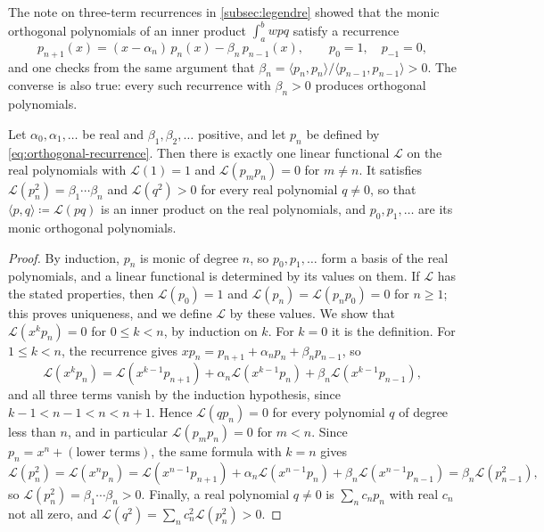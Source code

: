 The note on three-term recurrences in \cref{subsec:legendre} showed that the monic orthogonal polynomials of an inner product $\int_a^bwpq$ satisfy a recurrence
\begin{equation}
p_{n+1}(x)=(x-\alpha_n)\,p_n(x)-\beta_n\,p_{n-1}(x),\qquad p_0=1,\quad p_{-1}=0,
\label{eq:orthogonal-recurrence}
\end{equation}
and one checks from the same argument that $\beta_n=\langle p_n,p_n\rangle/\langle p_{n-1},p_{n-1}\rangle>0$. The converse is also true: every such recurrence with $\beta_n>0$ produces orthogonal polynomials.

\begin{theorem}[Favard]
\label{thm:favard}
Let $\alpha_0,\alpha_1,\ldots$ be real and $\beta_1,\beta_2,\ldots$ positive, and let $p_n$ be defined by \eqref{eq:orthogonal-recurrence}. Then there is exactly one linear functional $\mathcal L$ on the real polynomials with $\mathcal L(1)=1$ and $\mathcal L(p_mp_n)=0$ for $m\ne n$. It satisfies $\mathcal L(p_n^2)=\beta_1\cdots\beta_n$ and $\mathcal L(q^2)>0$ for every real polynomial $q\ne0$, so that $\langle p,q\rangle\coloneqq\mathcal L(pq)$ is an inner product on the real polynomials, and $p_0,p_1,\ldots$ are its monic orthogonal polynomials.
\end{theorem}

\begin{proof}
By induction, $p_n$ is monic of degree $n$, so $p_0,p_1,\ldots$ form a basis of the real polynomials, and a linear functional is determined by its values on them. If $\mathcal L$ has the stated properties, then $\mathcal L(p_0)=1$ and $\mathcal L(p_n)=\mathcal L(p_np_0)=0$ for $n\ge1$; this proves uniqueness, and we define $\mathcal L$ by these values. We show that $\mathcal L(x^kp_n)=0$ for $0\le k<n$, by induction on $k$. For $k=0$ it is the definition. For $1\le k<n$, the recurrence gives $xp_n=p_{n+1}+\alpha_np_n+\beta_np_{n-1}$, so
\[
\mathcal L(x^kp_n)=\mathcal L(x^{k-1}p_{n+1})+\alpha_n\mathcal L(x^{k-1}p_n)+\beta_n\mathcal L(x^{k-1}p_{n-1}),
\]
and all three terms vanish by the induction hypothesis, since $k-1<n-1<n<n+1$. Hence $\mathcal L(qp_n)=0$ for every polynomial $q$ of degree less than $n$, and in particular $\mathcal L(p_mp_n)=0$ for $m<n$. Since $p_n=x^n+(\text{lower terms})$, the same formula with $k=n$ gives
\[
\mathcal L(p_n^2)=\mathcal L(x^np_n)=\mathcal L(x^{n-1}p_{n+1})+\alpha_n\mathcal L(x^{n-1}p_n)+\beta_n\mathcal L(x^{n-1}p_{n-1})=\beta_n\mathcal L(p_{n-1}^2),
\]
so $\mathcal L(p_n^2)=\beta_1\cdots\beta_n>0$. Finally, a real polynomial $q\ne0$ is $\sum_nc_np_n$ with real $c_n$ not all zero, and $\mathcal L(q^2)=\sum_nc_n^2\mathcal L(p_n^2)>0$.
\end{proof}

